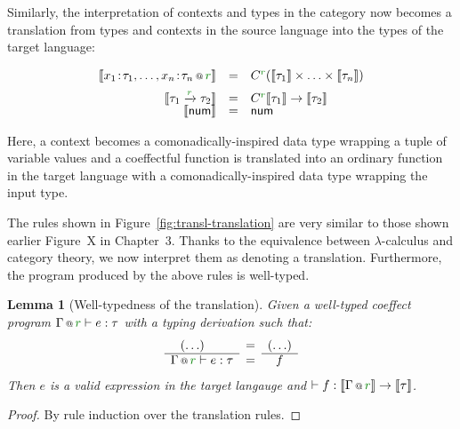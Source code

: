 \documentclass[
		twoside,openright,titlepage,numbers=noenddot,headinclude,%
                footinclude=true,cleardoublepage=empty,
                BCOR=10mm,paper=a4,fontsize=10pt, %
                ngerman,american, %
                ]{scrreprt}
\makeatletter
\newcounter{mythmcounter}
\newtheorem{lemma}[mythmcounter]{Lemma}
\newcommand{\ident}[1]{\textnormal{\sffamily #1}}
\newcommand{\ctyp}[2]{C^{#1}#2}
\newcommand{\cclrd}[1]{\textcolor{cclr}{#1}}
\newcommand{\coctx}[2]{ #1 \,\text{\scriptsize @}\, {{\text{$#2$}}}  }
\newcommand{\sem}[1]{\llbracket #1 \rrbracket}
\makeatother
\begin{document}
Similarly, the interpretation of contexts and types in the category now becomes a translation from types and
contexts in the source language into the types of the target language:

\begin{equation*}
\begin{array}{rcl}
\sem{\coctx{x_1\!:\!\tau_1, \ldots, x_n\!:\!\tau_n}{\cclrd{r}}} &=& \ctyp{\cclrd{r}}{(\sem{\tau_1} \times \ldots \times \sem{\tau_n})} \\[0.5em]
\sem{\tau_1 \xrightarrow{\cclrd{r}} \tau_2} & = & \ctyp{\cclrd{r}}{\sem{\tau_1}} \rightarrow \sem{\tau_2} \\[-0.2em]
\sem{\ident{num}} & = & \ident{num} \\
\end{array}
\end{equation*}

Here, a context becomes a comonadically-inspired data type wrapping a tuple of variable values 
and a coeffectful function is translated into an ordinary function in the target language
with a comonadically-inspired data type wrapping the input type.

The rules shown in Figure~\ref{fig:transl-translation} are very similar to those shown earlier
Figure~X in Chapter~3. Thanks to the equivalence between $\lambda$-calculus and category theory,
we now interpret them as denoting a translation. Furthermore, the program produced by the above
rules is well-typed.

\begin{lemma}[Well-typedness of the translation]
Given a well-typed coeffect program $\coctx{\Gamma}{\cclrd{r}} \vdash e : \tau$ with a 
typing derivation such that:
%  
\begin{equation*}  
  \semdeff
    {(\ldots)\qquad~}
    {\coctx{\Gamma}{\cclrd{r}} \vdash e : \tau }
    {(\ldots)}
    { ~~f }
\end{equation*}  
%
Then $e$ is a valid expression in the target langauge and $\vdash f : \sem{\coctx{\Gamma}{\cclrd{r}}} \rightarrow \sem{\tau}$.
\end{lemma}
\begin{proof}
  By rule induction over the translation rules.
\end{proof}
\end{document}
